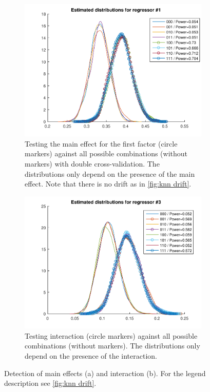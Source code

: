 \documentclass[paper=a4,fontsize=12pt]{scrartcl}
\numberwithin{equation}{section} %
\numberwithin{figure}{section} %
\numberwithin{table}{section} %
\begin{document}
\begin{figure}[t]
\begin{subfigure}[t]{0.49\textwidth}
\includegraphics[width=\textwidth]{sample_knn2_distributions_1}
\caption{Testing the main effect for the first factor (circle markers) against all possible combinations (without markers) with double cross-validation. The distributions only depend on the presence of the main effect. Note that there is no drift as in \autoref{fig:knn drift}.} \label{fig:2xval for main effect}
\end{subfigure}%
\hfill
\begin{subfigure}[t]{0.49\textwidth}
\includegraphics[width=\textwidth]{sample_knn2_distributions_3}
\caption{Testing interaction (circle markers) against all possible combinations (without markers). The distributions only depend on the presence of the interaction.} \label{fig:test interaction}
\end{subfigure}
\caption{Detection of main effects (a) and interaction (b). For the legend description see \autoref{fig:knn drift}.}
\end{figure}
\end{document}
